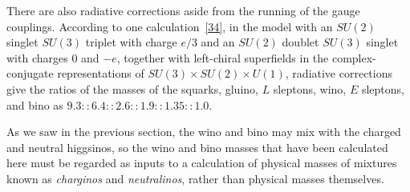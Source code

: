 There are also radiative corrections aside from the running of the gauge
couplings. According to one calculation~\hyperref[ch28-ref-34]{[34]}, in
the model with an \(SU(2)\) singlet \(SU(3)\) triplet with charge \(e/3\)
and an \(SU(2)\) doublet \(SU(3)\) singlet with charges 0 and \(-e\),
together with left-chiral superfields in the complex-conjugate
representations of \(SU(3)\times SU(2)\times U(1)\),
radiative corrections give the ratios of the masses of the squarks,
gluino, \(L\) sleptons, wino, \(E\) sleptons, and bino as
\(9.3::6.4::2.6::1.9::1.35::1.0\).

As we saw in the previous section, the wino and bino may mix with the
charged and neutral higgsinos, so the wino and bino masses that have been
calculated here must be regarded as inputs to a calculation of physical
masses of mixtures known as \emph{charginos} and \emph{neutralinos},
rather than physical masses themselves.

